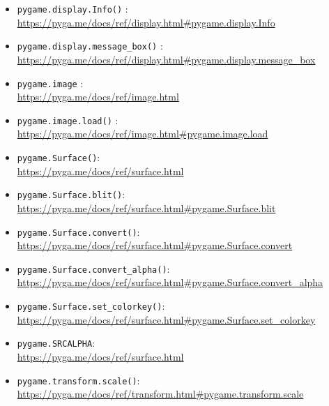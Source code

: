 \begin{pygbox}
	\begin{itemize}
	\item \texttt{pygame.display.Info()}	
	:\\	
	\url{https://pyga.me/docs/ref/display.html#pygame.display.Info}
	
	\item \texttt{pygame.display.message\_box()}   
	:\\    
	\url{https://pyga.me/docs/ref/display.html#pygame.display.message_box}

	\item \texttt{pygame.image}
	:\\
	\url{https://pyga.me/docs/ref/image.html}

	\item \texttt{pygame.image.load()}
	:\\
	\url{https://pyga.me/docs/ref/image.html#pygame.image.load}
	
	\item \texttt{pygame.Surface()}:
	\\
	\url{https://pyga.me/docs/ref/surface.html}
	
	\item \texttt{pygame.Surface.blit()}:
	\\
	\url{https://pyga.me/docs/ref/surface.html#pygame.Surface.blit}

	\item \texttt{pygame.Surface.convert()}:
	\\
	\url{https://pyga.me/docs/ref/surface.html#pygame.Surface.convert}
	
	\item \texttt{pygame.Surface.convert\_alpha()}:
	\\
	\url{https://pyga.me/docs/ref/surface.html#pygame.Surface.convert\_alpha}
	
	\item \texttt{pygame.Surface.set\_colorkey()}:
	\\
	\url{https://pyga.me/docs/ref/surface.html#pygame.Surface.set\_colorkey}
	
	\item \texttt{pygame.SRCALPHA}:
	\\
	\url{https://pyga.me/docs/ref/surface.html}

	\item \texttt{pygame.transform.scale()}:
	\\
	\url{https://pyga.me/docs/ref/transform.html#pygame.transform.scale}
	
\end{itemize}
\end{pygbox}
